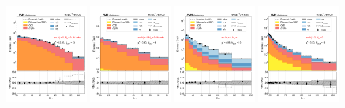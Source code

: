 \begin{figure}[htb!]
    \centering
    \includegraphics[width=0.24\textwidth]{chapters/Analysis/sectionStatisticalAnalysis/figures/fit/etau_cat_eq0_eq0}
    \includegraphics[width=0.24\textwidth]{chapters/Analysis/sectionStatisticalAnalysis/figures/fit/etau_cat_eq1_eq0}
    \includegraphics[width=0.24\textwidth]{chapters/Analysis/sectionStatisticalAnalysis/figures/fit/etau_cat_eq1_eq1}
    \includegraphics[width=0.24\textwidth]{chapters/Analysis/sectionStatisticalAnalysis/figures/fit/etau_cat_gt2_eq0}


\end{figure}
